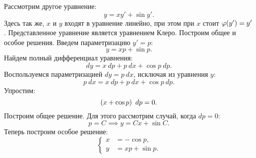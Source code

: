 		Рассмотрим другое уравнение:
		\[ y = xy' + \sin{y'}. \]
		Здесь так же, $x$ и $y$ входят в уравнение линейно, при этом при $x$ стоит $\varphi(y') = y'$. Представленное уравнение является уравнением Клеро. Построим общее и особое решения. Введем параметризацию $y' = p$:
		\[ y = xp + \sin{p}. \]
		Найдем полный дифференциал уравнения:
		\[ dy = x ~ dp + p ~ dx + \cos{p} ~ dp. \]
		Воспользуемся параметризацией $dy = p ~ dx$, исключая из уравнения $y$:
		\[ p ~ dx = x ~ dp + p ~ dx + \cos{p} ~ dp. \]
		Упростим:
		\[ \left( x + \cos{p} \right) ~ dp = 0. \]
		Построим общее решение. Для этого рассмотрим случай, когда $dp = 0$:
		\[ p = C \implies y = Cx + \sin{C}. \]
		Теперь построим особое решение:
		\[ \left\lbrace \begin{split} x &= - \cos{p}, \\ y &= xp + \sin{p}. \end{split} \right. \]
